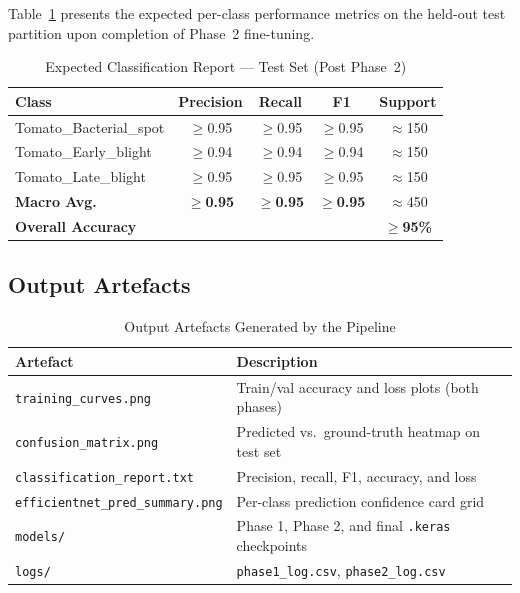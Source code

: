 \documentclass[12pt, a4paper, onecolumn]{IEEEtran}
\begin{document}
Table~\ref{tab:clsreport} presents the expected per-class performance metrics on the held-out test
partition upon completion of Phase~2 fine-tuning.

\begin{table}[H]
  \centering
  \caption{Expected Classification Report --- Test Set (Post Phase~2)}
  \label{tab:clsreport}
  \begin{tabular}{lcccc}
    \toprule
    \textbf{Class}             & \textbf{Precision} & \textbf{Recall} & \textbf{F1} & \textbf{Support} \\
    \midrule
    Tomato\_Bacterial\_spot    & $\geq$0.95 & $\geq$0.95 & $\geq$0.95 & $\approx$150 \\
    Tomato\_Early\_blight      & $\geq$0.94 & $\geq$0.94 & $\geq$0.94 & $\approx$150 \\
    Tomato\_Late\_blight       & $\geq$0.95 & $\geq$0.95 & $\geq$0.95 & $\approx$150 \\
    \midrule
    \textbf{Macro Avg.}        & $\geq$\textbf{0.95} & $\geq$\textbf{0.95} & $\geq$\textbf{0.95} & $\approx$450 \\
    \multicolumn{4}{l}{\textbf{Overall Accuracy}} & $\geq$\textbf{95\%} \\
    \bottomrule
  \end{tabular}
\end{table}

\subsection{Output Artefacts}

\begin{table}[H]
  \centering
  \caption{Output Artefacts Generated by the Pipeline}
  \label{tab:artefacts}
  \begin{tabularx}{\linewidth}{lX}
    \toprule
    \textbf{Artefact} & \textbf{Description} \\
    \midrule
    \texttt{training\_curves.png}            & Train/val accuracy and loss plots (both phases) \\
    \texttt{confusion\_matrix.png}           & Predicted vs.\ ground-truth heatmap on test set \\
    \texttt{classification\_report.txt}      & Precision, recall, F1, accuracy, and loss \\
    \texttt{efficientnet\_pred\_summary.png} & Per-class prediction confidence card grid \\
    \texttt{models/}                         & Phase 1, Phase 2, and final \texttt{.keras} checkpoints \\
    \texttt{logs/}                           & \texttt{phase1\_log.csv}, \texttt{phase2\_log.csv} \\
    \bottomrule
  \end{tabularx}
\end{table}
\end{document}
